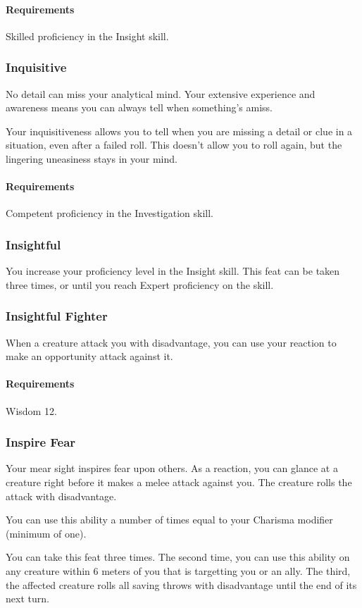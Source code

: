     \paragraph{Requirements} Skilled proficiency in the Insight skill.
\subsubsection{Inquisitive} \label{feat::inquisitive}
    No detail can miss your analytical mind.
    Your extensive experience and awareness means you can always tell when something's amiss.

    Your inquisitiveness allows you to tell when you are missing a detail or clue in a situation, even after a failed roll.
    This doesn't allow you to roll again, but the lingering uneasiness stays in your mind.
    \paragraph{Requirements} Competent proficiency in the Investigation skill.
\subsubsection{Insightful} \label{feat::insightful}
    You increase your proficiency level in the Insight skill.
    This feat can be taken three times, or until you reach Expert proficiency on the skill.
\subsubsection{Insightful Fighter} \label{feat::insightfulfighter}
    When a creature attack you with disadvantage, you can use your reaction to make an opportunity attack against it.
    \paragraph{Requirements} Wisdom 12.
\subsubsection{Inspire Fear} \label{feat::inspirefear}
    Your mear sight inspires fear upon others.
    As a reaction, you can glance at a creature right before it makes a melee attack against you.
    The creature rolls the attack with disadvantage.

    You can use this ability a number of times equal to your Charisma modifier (minimum of one).

    You can take this feat three times.
    The second time, you can use this ability on any creature within 6 meters of you that is targetting you or an ally.
    The third, the affected creature rolls all saving throws with disadvantage until the end of its next turn.
